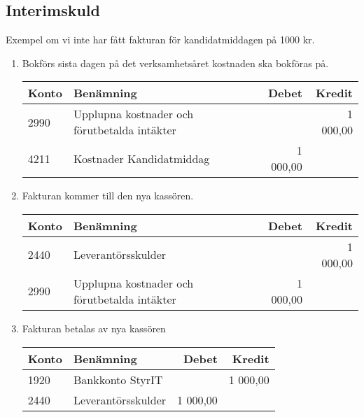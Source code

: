 \documentclass{article}
\begin{document}
\subsection{Interimskuld}
Exempel om vi inte har fått fakturan för kandidatmiddagen på 1000 kr. 
\begin{enumerate}
\item Bokförs sista dagen på det verksamhetsåret kostnaden ska bokföras på.

\begin{tabular}{l | l | r | r}
\hline
Konto & Benämning & Debet & Kredit \\
\hline
2990 & Upplupna kostnader och förutbetalda intäkter & & 1 000,00 \\
4211 & Kostnader Kandidatmiddag & 1 000,00 &  \\
\end{tabular}

\item Fakturan kommer till den nya kassören.   

\begin{tabular}{l | l | r | r}
\hline
Konto & Benämning & Debet & Kredit \\
\hline
2440 & Leverantörsskulder &  & 1 000,00\\
2990 & Upplupna kostnader och förutbetalda intäkter & 1 000,00 &  \\
\end{tabular}

\item Fakturan betalas av nya kassören

\begin{tabular}{l | l | r | r}
\hline
Konto & Benämning & Debet & Kredit \\
\hline
1920 & Bankkonto StyrIT & & 1 000,00  \\
2440 & Leverantörsskulder & 1 000,00 & \\
\end{tabular}
\end{enumerate}
\end{document}

